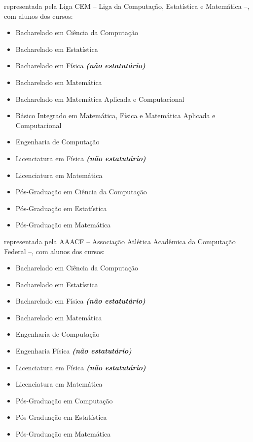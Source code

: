 \begin{article}
\begin{description}[noitemsep]
		\item[UNICAMP - Campinas] representada pela Liga CEM -- Liga da Computação, Estatística e Matemática --, com alunos dos cursos:
		\begin{itemize}[noitemsep]
			\item Bacharelado em Ciência da Computação
			\item Bacharelado em Estatística
			\item Bacharelado em Física \textbf{\textit{(não estatutário)}}
			\item Bacharelado em Matemática
			\item Bacharelado em Matemática Aplicada e Computacional
			\item Básico Integrado em Matemática, Física e Matemática Aplicada e Computacional
			\item Engenharia de Computação
			\item Licenciatura em Física \textbf{\textit{(não estatutário)}}
			\item Licenciatura em Matemática
			\item Pós-Graduação em Ciência da Computação
			\item Pós-Graduação em Estatística
			\item Pós-Graduação em Matemática
		\end{itemize}

		\item[UFSCar - São Carlos] representada pela AAACF -- Associação Atlética Acadêmica da Computação Federal --, com alunos dos cursos:
		\begin{itemize}[noitemsep]
			\item Bacharelado em Ciência da Computação
			\item Bacharelado em Estatística
			\item Bacharelado em Física \textbf{\textit{(não estatutário)}}
			\item Bacharelado em Matemática
			\item Engenharia de Computação
			\item Engenharia Física \textbf{\textit{(não estatutário)}}
			\item Licenciatura em Física \textbf{\textit{(não estatutário)}}
			\item Licenciatura em Matemática
			\item Pós-Graduação em Computação
			\item Pós-Graduação em Estatística
			\item Pós-Graduação em Matemática
		\end{itemize}


\end{description}
\end{article}
